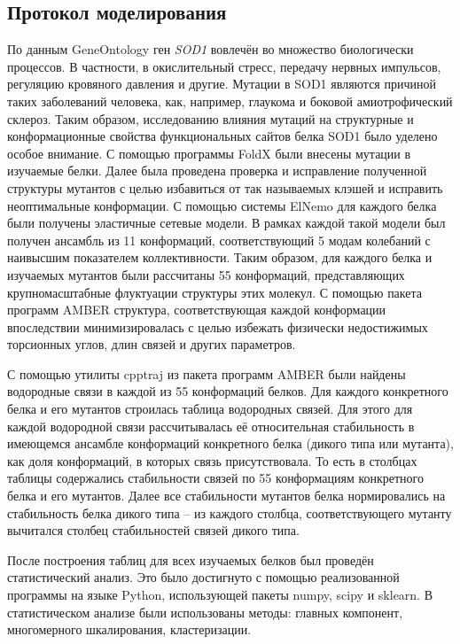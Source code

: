 \subsection{Протокол моделирования} \label{subsect_EN_protocol}

По данным GeneOntology ген \textit{SOD1} вовлечён во множество биологически процессов. В частности, в окислительный стресс, передачу нервных импульсов, регуляцию кровяного давления и другие. Мутации в SOD1 являются причиной таких заболеваний человека, как, например, глаукома и боковой амиотрофический склероз. Таким образом, исследованию влияния мутаций на структурные и конформационные свойства функциональных сайтов белка SOD1 было уделено особое внимание. 
С помощью программы FoldX \cite{Guerois2002} были внесены мутации в изучаемые белки. Далее была проведена проверка и исправление полученной структуры мутантов с целью избавиться от так называемых клэшей и исправить неоптимальные конформации. С помощью системы ElNemo \cite{Suhre2004} для каждого белка были получены эластичные сетевые модели. В рамках каждой такой модели был получен ансамбль из 11 конформаций, соответствующий 5  модам колебаний с наивысшим показателем коллективности. Таким образом, для каждого белка и изучаемых мутантов были рассчитаны 55 конформаций, представляющих крупномасштабные флуктуации структуры этих молекул. С помощью пакета программ AMBER \cite{Salomon-Ferrer2013} структура, соответствующая каждой конформации впоследствии минимизировалась с целью избежать физически недостижимых торсионных углов, длин связей и других параметров.

С помощью утилиты cpptraj из пакета программ AMBER были найдены водородные связи в каждой из 55 конформаций белков. Для каждого конкретного белка и его мутантов строилась таблица водородных связей. Для этого для каждой водородной связи рассчитывалась её относительная стабильность в имеющемся ансамбле конформаций конкретного белка (дикого типа или мутанта), как доля конформаций, в которых связь присутствовала. То есть в столбцах таблицы содержались стабильности связей по 55 конформациям конкретного белка и его мутантов. Далее все стабильности мутантов белка нормировались на стабильность белка дикого типа – из каждого столбца, соответствующего мутанту вычитался столбец стабильностей связей дикого типа.

После построения таблиц для всех изучаемых белков был проведён статистический анализ. Это было достигнуто с помощью реализованной программы на языке Python, использующей пакеты numpy, scipy и sklearn. В статистическом анализе были использованы методы: главных компонент, многомерного шкалирования, кластеризации. 

